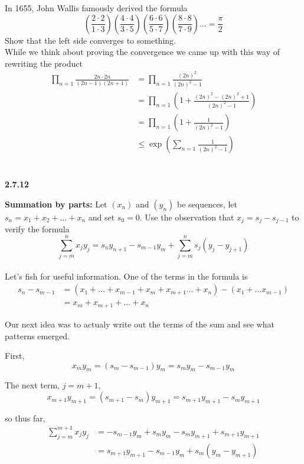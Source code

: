 In 1655, John Wallis famously derived the formula
$$
\left(\frac{2\cdot2}{1\cdot3}\right)
\left(\frac{4\cdot4}{3\cdot5}\right)
\left(\frac{6\cdot6}{5\cdot7}\right)
\left(\frac{8\cdot8}{7\cdot9}\right)
\ldots
= \frac{\pi}{2}
$$
Show that the left side converges to something.
\\

While we think about proving the convergence we came up with this way of rewriting the product
\begin{align*}
\prod_{n=1} \frac{2n\cdot2n}{(2n-1)(2n+1)}
&= \prod_{n=1} \frac{(2n)^2}{(2n)^2 -1} \\
&= \prod_{n=1} \left( 1 + \frac{(2n)^2 - (2n)^2 +1}{(2n)^2 -1} \right) \\
&= \prod_{n=1} \left( 1 + \frac{1}{(2n)^2 -1} \right) \\
&\leq \exp \left( \sum_{n=1} \frac{1}{(2n)^2 -1} \right)
\end{align*}
\\~\\


\textbf{2.7.12}

\textbf{Summation by parts:}
Let $(x_n)$ and $(y_n)$ be sequences,
let $s_n = x_1 + x_2 + \ldots + x_n$ and set $s_0 = 0$.
Use the observation that $x_j = s_j - s_{j-1}$
to verify the formula
$$
\sum^{n}_{j=m} x_j y_j =
s_n y_{n+1} - s_{m-1}y_m + \sum^{n}_{j=m} s_j (y_j - y_{j+1})
$$
\\

Let's fish for useful information.
One of the terms in the formula is
\begin{align*}
s_n - s_{m-1} &= 
    (x_1 + \ldots + x_{m-1} + x_m + x_{m+1} \ldots + x_n)
    - (x_1 + \ldots x_{m-1}) \\
&= x_m + x_{m+1} + \ldots + x_n
\end{align*}

Our next idea was to actualy write out the terms of the sum and see what patterns emerged.

First,
$$
x_m y_m = (s_m - s_{m-1})y_m = s_m y_m - s_{m-1} y_m
$$

The next term, $j=m+1$,
$$
x_{m+1} y_{m+1} = (s_{m+1} - s_m) y_{m+1} = 
s_{m+1} y_{m+1} - s_m y_{m+1}
$$

so thus far,
\begin{align*}
\sum^{m+1}_{j=m} x_j y_j &= - s_{m-1} y_m + s_m y_m - s_m y_{m+1} + s_{m+1} y_{m+1} \\
&= s_{m+1} y_{m+1} - s_{m-1} y_m + s_m (y_m - y_{m+1})
\end{align*}

